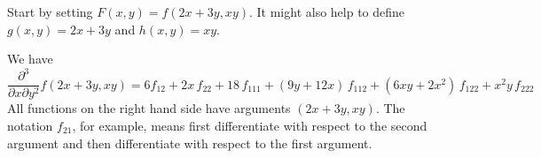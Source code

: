 \begin{hint}
Start by setting $F(x,y)=f(2x+3y,xy)$. It might also help to define $g(x,y)=2x+3y$ and $h(x,y)=xy$.
\end{hint}

\begin{answer}
We have
\begin{equation*}
\frac{\partial^3}{\partial x\partial y^2}f(2x+3y,xy)
=6f_{12}+2x\,f_{22}+18\,f_{111}+(9y+12x)\,f_{112}
+(6xy+2x^2)\,f_{122}+x^2y\,f_{222}
\end{equation*}
All functions on the right hand side have arguments $(2x+3y,xy)$.
The notation $f_{21}$, for example, means first differentiate with 
respect to the second argument and then differentiate with respect 
to the first argument.
\end{answer}

